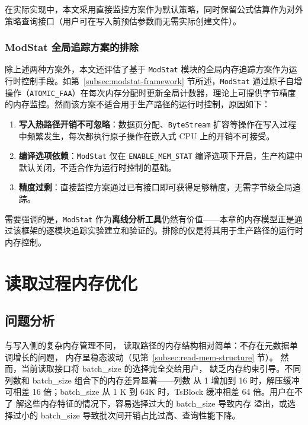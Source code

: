 在实际实现中，本文采用直接监控方案作为默认策略，同时保留公式估算作为对外策略查询接口（用户可在写入前预估参数而无需实际创建文件）。


\subsubsection{ModStat 全局追踪方案的排除}

除上述两种方案外，本文还评估了基于 \texttt{ModStat} 模块的全局内存追踪方案作为运行时控制手段。如第~\ref{subsec:modstat-framework} 节所述，\texttt{ModStat} 通过原子自增操作（\texttt{ATOMIC\_FAA}）在每次内存分配时更新全局计数器，理论上可提供字节精度的内存监控。然而该方案不适合用于生产路径的运行时控制，原因如下：

\begin{enumerate}
  \item \textbf{写入热路径开销不可忽略}：数据页分配、\texttt{ByteStream} 扩容等操作在写入过程中频繁发生，每次都执行原子操作在嵌入式 CPU 上的开销不可接受。
  \item \textbf{编译选项依赖}：\texttt{ModStat} 仅在 \texttt{ENABLE\_MEM\_STAT} 编译选项下开启，生产构建中默认关闭，不适合作为运行时控制的基础。
  \item \textbf{精度过剩}：直接监控方案通过已有接口即可获得足够精度，无需字节级全局追踪。
\end{enumerate}

需要强调的是，\texttt{ModStat} 作为\textbf{离线分析工具}仍然有价值——本章的内存模型正是通过该框架的逐模块追踪实验建立和验证的。排除的仅是将其用于生产路径的运行时内存控制。



\section{读取过程内存优化}

\subsection{问题分析}

与写入侧的复杂内存管理不同，
读取路径的内存结构相对简单：不存在元数据单调增长的问题，
内存呈稳态波动（见第~\ref{subsec:read-mem-structure} 节）。
然而，当前读取接口将 batch\_size 的选择完全交给用户，
缺乏内存约束引导。不同列数和 batch\_size 组合下的内存差异显著——列数
从 1 增加到 16 时，解压缓冲可相差 16 倍；batch\_size 从 1
K 到 64K 时，TsBlock 缓冲相差 64 倍。用户在不了
解这些内存特征的情况下，容易选择过大的 batch\_size 导致内存
溢出，或选择过小的 batch\_size 导致批次间开销占比过高、查询性能下降。

